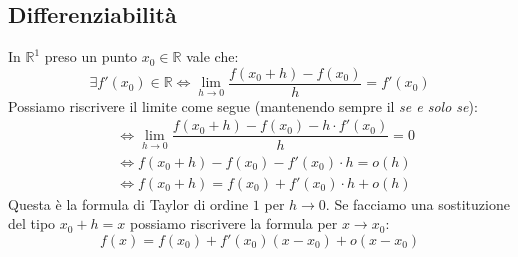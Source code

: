 \subsection{Differenziabilità}
In $\mathbb{R}^1$ preso un punto $x_0 \in \mathbb{R}$ vale che:
\begin{equation*}
	\exists f'(x_0) \in \mathbb{R} \iff \lim_{h \to 0} \dfrac{f(x_0 + h) - f(x_0)}{h} = f'(x_0)
\end{equation*}
Possiamo riscrivere il limite come segue (mantenendo sempre il \textit{se e solo se}):
\begin{align*}
	&\iff \lim_{h \to 0} \dfrac{f(x_0 + h) - f(x_0) - h \cdot f'(x_0)}{h} = 0\\[5pt]
	&\iff f(x_0 + h) - f(x_0) - f'(x_0) \cdot h = o(h)\\[5pt]
	&\iff f(x_0 + h) = f(x_0) + f'(x_0) \cdot h + o(h)
\end{align*}
Questa è la formula di Taylor di ordine $1$ per $h \to 0$. Se facciamo una sostituzione del tipo $x_0 + h = x$ possiamo riscrivere la formula per $x \to x_0$:
\begin{equation*}
	f(x) = f(x_0) + f'(x_0) (x - x_0) + o(x - x_0)
\end{equation*}


